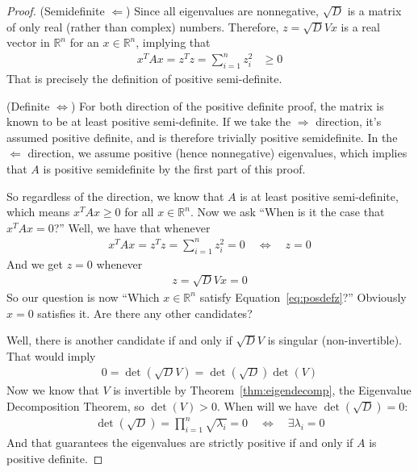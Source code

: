 \documentclass[12pt]{article}
\numberwithin{equation}{section} %
\theoremstyle{plain}
\theoremstyle{definition}
\theoremstyle{remark}
\newcommand{\Rn}{\mathbb{R}^n}
\begin{document}
\begin{proof}


(Semidefinite $\Leftarrow$)
Since all eigenvalues are nonnegative, $\sqrt{D}$ is a matrix of only
real (rather than complex) numbers. Therefore, $z = \sqrt{D} Vx$ is a
real vector in $\Rn$ for an $x\in\Rn$, implying that
\begin{align*}
  x^T A x = z^T z =
  \sum^n_{i=1} z_i^2 &\geq 0
\end{align*}
That is precisely the definition of positive semi-definite.

(Definite $\Leftrightarrow$)
For both direction of the positive definite proof, the matrix is known
to be at least positive semi-definite.  If we take the $\Rightarrow$
direction, it's assumed positive definite, and is therefore trivially
positive semidefinite. In the $\Leftarrow$ direction, we assume positive
(hence nonnegative) eigenvalues, which implies that $A$ is positive
semidefinite by the first part of this proof.

So regardless of the direction, we know that $A$ is at least positive
semi-definite, which means $x^TAx\geq 0$ for all $x\in\Rn$. Now we ask
``When is it the case that $x^T A x= 0$?'' Well, we have that whenever
\begin{align*}
  x^T A x = z^T z = \sum^n_{i=1} z^2_i = 0
  \quad\Leftrightarrow\quad
  z=0
\end{align*}
And we get $z=0$ whenever
\begin{align}
  \label{eq:posdefz}
  z = \sqrt{D}V x = 0
\end{align}
So our question is now ``Which $x\in\Rn$ satisfy
Equation~\ref{eq:posdefz}?'' Obviously $x=0$ satisfies it. Are there any
other candidates?

Well, there is another candidate if and only if $\sqrt{D}V$ is singular
(non-invertible). That would imply
\begin{align*}
  0 = \det\left(\sqrt{D}V\right)
  = \det\left(\sqrt{D}\right) \det\left(V\right)
\end{align*}
Now we know that $V$ is invertible by Theorem~\ref{thm:eigendecomp}, the
Eigenvalue Decomposition Theorem, so $\det(V)>0$. When will we
have $\det\left(\sqrt{D}\right)=0$:
\begin{align*}
  \det\left(\sqrt{D}\right)= \prod_{i=1}^n \sqrt{\lambda_i} =0
  \quad\Leftrightarrow\quad
  \exists \lambda_i = 0
\end{align*}
And that guarantees the eigenvalues are strictly positive if and only if
$A$ is positive definite.


\end{proof}
\end{document}
